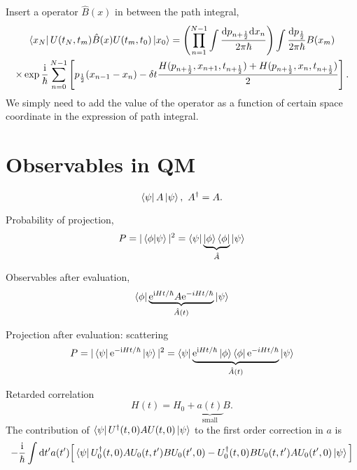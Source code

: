 

Insert a operator $\hat{B}(x)$ in between the path integral, 
\begin{equation}
    \begin{gathered}
        \bra{x_N} U(t_N, t_m) \hat{B}(x) U(t_m, t_0) \ket{x_0} = 
        \left( \prod_{n=1}^{N-1} \int \frac{\mathrm{d} p_{n+\frac{1}{2}}\mathrm{d} x_n}{2\pi \hbar} \right) \int \frac{\mathrm{d} p_{\frac{1}{2}}}{2\pi\hbar} 
        B(x_m)
        \\
        \times \exp \frac{\mathrm{i} }{\hbar} \sum_{n=0}^{N-1} \left[ p_{\frac{1}{2}}(x_{n-1}- x_{n})  - \delta t \frac{H(p_{n+\frac{1}{2}}, x_{n+1}, t_{n+\frac{1}{2}}) + H(p_{n+\frac{1}{2}}, x_{n}, t_{n+ \frac{1}{2}})}{2}\right] .
    \end{gathered}
\end{equation}
We simply need to add the value of the operator as a function of certain space coordinate in the expression of path integral.

\section{Observables in QM}

\begin{equation}
  \bra{\psi} A \ket{\psi}, \ A^{\dagger} = A.
\end{equation}

Probability of projection,
\begin{equation}
  P = |\bra{\phi}\ket{\psi}|^2 = \bra{\psi} \underbrace{\ket{\phi} \bra{\phi}}_{\hat{A}}\ket{\psi}
\end{equation}

Observables after evaluation,
\begin{equation}
  \bra{\phi} \underbrace{\mathrm{e}^{\mathrm{i} H t / \hbar} A \mathrm{e}^{- i H t / \hbar}}_{\hat{A}(t)} \ket{\psi}
\end{equation}

Projection after evaluation: scattering
\begin{equation}
  P = |\bra{\psi} \mathrm{e}^{- \mathrm{i}  Ht / \hbar}\ket{\psi}|^2 = \bra{\psi} \underbrace{\mathrm{e}^{\mathrm{i} H t / \hbar} \ket{\phi}\bra{\phi} \mathrm{e}^{- i H t / \hbar}}_{\hat{A}(t)} \ket{\psi}
\end{equation}

Retarded correlation
\begin{equation}
  H(t) = H_0 + \underbrace{a(t)}_{\text{small}} B.
\end{equation}
The contribution of $\bra{\psi}U^{\dagger}(t,0) A U(t,0)\ket{\psi}$ to the first order correction in $a$ is
% 
% 
% 
\begin{equation}
    - \frac{\mathrm{i} }{\hbar} \int \mathrm{d} t' a(t')\Big[ \bra{\psi}U_0^{\dagger}(t,0) A U_0(t,t') B U_0(t',0) - U_0^{\dagger}(t,0) B U_0(t,t') A U_0(t',0)\ket{\psi} \Big] 
\end{equation}




